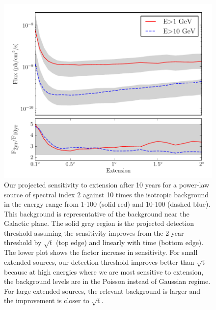 \documentclass[12pt,preprint]{aastex}
\newcommand{\gev}{\text{GeV}\xspace}
\begin{document}
\begin{figure}
  \begin{center}
    \includegraphics{mc_plots/time_sensitivity.pdf}
    \end{center}
    \caption{
    Our projected sensitivity to extension after 10 years for a power-law
    source of spectral index 2 against 10 times the isotropic background
    in the energy range from 1-100 \gev (solid red) and 10-100 \gev
    (dashed blue). This background is representative of the background
    near the Galactic plane.  The solid gray region is the projected
    detection threshold assuming the sensitivity improves from the 2
    year threshold by $\sqrt{\text{t}}$ (top edge) and linearly with
    time (bottom edge).  The lower plot shows the factor increase in
    sensitivity.  For small extended sources, our detection threshold
    improves better than $\sqrt{\text{t}}$ because at high energies where
    we are most sensitive to extension, the background levels are in the
    Poisson instead of Gaussian regime.  For large extended sources,
    the relevant background is larger and the improvement is closer
    to $\sqrt{\text{t}}$.
    }\label{time_sensitivity}
  \end{figure}
\end{document}
